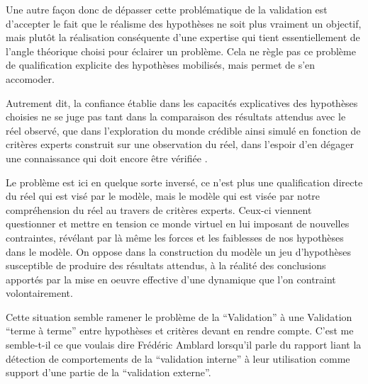 Une autre façon donc de dépasser cette problématique de la validation est d'accepter le fait que le réalisme des hypothèses ne soit plus vraiment un objectif, mais plutôt la réalisation conséquente d'une expertise qui tient essentiellement de l'angle théorique choisi pour éclairer un problème. Cela ne règle pas ce problème de qualification explicite des hypothèses mobilisés, mais permet de s'en accomoder.

Autrement dit, la confiance établie dans les capacités explicatives des hypothèses choisies ne se juge pas tant dans la comparaison des résultats attendus avec le réel observé, que dans l'exploration du monde crédible ainsi simulé en fonction de critères experts construit sur une observation du réel, dans l'espoir d'en dégager une connaissance qui doit encore être vérifiée . 

Le problème est ici en quelque sorte inversé, ce n'est plus une qualification directe du réel qui est visé par le modèle, mais le modèle qui est visée par notre compréhension du réel au travers de critères experts. Ceux-ci viennent questionner et mettre en tension ce monde virtuel en lui imposant de nouvelles contraintes, révélant par là même les forces et les faiblesses de nos hypothèses dans le modèle. On oppose dans la construction du modèle un jeu d'hypothèses susceptible de produire des résultats attendus, à la réalité des conclusions apportés par la mise en oeuvre effective d'une dynamique que l'on contraint volontairement.

Cette situation semble ramener le problème de la \enquote{Validation} à une Validation \enquote{terme à terme} entre hypothèses et critères devant en rendre compte. C’est me semble-t-il ce que voulais dire Frédéric Amblard \textcite{Amblard2006} lorsqu’il parle du rapport liant la détection de comportements de la \enquote{validation interne} à leur utilisation comme support d’une partie de la \enquote{validation externe}. %

